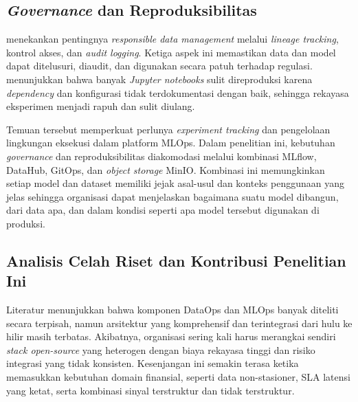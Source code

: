 \subsection{\textit{Governance} dan Reproduksibilitas}

\textcite{stoyanovich2020responsible} menekankan pentingnya \textit{responsible data management} melalui \textit{lineage tracking}, kontrol akses, dan \textit{audit logging}. Ketiga aspek ini memastikan data dan model dapat ditelusuri, diaudit, dan digunakan secara patuh terhadap regulasi. \textcite{pimentel2019notebooks} menunjukkan bahwa banyak \textit{Jupyter notebooks} sulit direproduksi karena \textit{dependency} dan konfigurasi tidak terdokumentasi dengan baik, sehingga rekayasa eksperimen menjadi rapuh dan sulit diulang.

Temuan tersebut memperkuat perlunya \textit{experiment tracking} dan pengelolaan lingkungan eksekusi dalam platform MLOps. Dalam penelitian ini, kebutuhan \textit{governance} dan reproduksibilitas diakomodasi melalui kombinasi MLflow, DataHub, GitOps, dan \textit{object storage} MinIO. Kombinasi ini memungkinkan setiap model dan dataset memiliki jejak asal-usul dan konteks penggunaan yang jelas sehingga organisasi dapat menjelaskan bagaimana suatu model dibangun, dari data apa, dan dalam kondisi seperti apa model tersebut digunakan di produksi.

\subsection{Analisis Celah Riset dan Kontribusi Penelitian Ini}

Literatur menunjukkan bahwa komponen DataOps dan MLOps banyak diteliti secara terpisah, namun arsitektur yang komprehensif dan terintegrasi dari hulu ke hilir masih terbatas. Akibatnya, organisasi sering kali harus merangkai sendiri \textit{stack open-source} yang heterogen dengan biaya rekayasa tinggi dan risiko integrasi yang tidak konsisten. Kesenjangan ini semakin terasa ketika memasukkan kebutuhan domain finansial, seperti data non-stasioner, SLA latensi yang ketat, serta kombinasi sinyal terstruktur dan tidak terstruktur.

